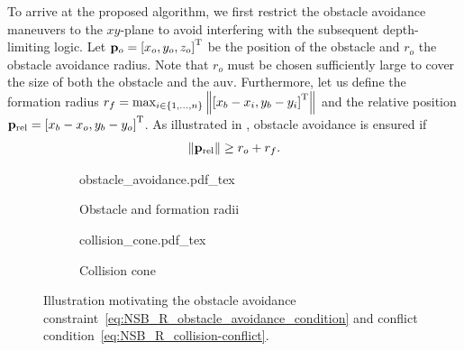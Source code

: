 To arrive at the proposed algorithm, we first restrict the obstacle avoidance maneuvers to the $xy$-plane to avoid interfering with the subsequent depth-limiting logic.
Let $\mathbf{p}_o = \left[x_o, y_o, z_o\right]^{\mathrm{T}}$ be the position of the obstacle and $r_o$ the obstacle avoidance radius.
Note that $r_o$ must be chosen sufficiently large to cover the size of both the obstacle and the \gls{auv}. %
Furthermore, let us define the formation radius
$
    r_f = \max_{i \in \{1, \ldots, n\}} \left\|\left[x_b-x_i, y_b-y_i\right]^{\mathrm{T}}\right\|
$
and the relative position $\mathbf{p}_{\rm rel} = \left[x_b - x_o, y_b - y_o\right]^{\mathrm{T}}$. As illustrated in , obstacle avoidance is ensured if 
\begin{equation}
    \left\|\mathbf{p}_{\rm rel}\right\| \geq r_o + r_f. \label{eq:NSB_R_obstacle_avoidance_condition}
\end{equation}

\begin{figure}[t]
    \centering
    \begin{subfigure}[t]{0.33\textwidth}
        \centering
        \def\svgwidth{\textwidth}
        {obstacle_avoidance.pdf_tex}
        \vspace*{-0.25em}
        \caption{Obstacle and formation radii}
        \label{fig:NSB_R_obstacle_radius}
        \vspace*{-0.25em}
    \end{subfigure}   
    \begin{subfigure}[t]{0.33\textwidth}
        \centering
        \def\svgwidth{\textwidth}
        {collision_cone.pdf_tex}
        \vspace*{-0.25em}
        \caption{Collision cone}
        \label{fig:NSB_R_collision_cone}
        \vspace*{-0.25em}
    \end{subfigure} 
    \caption{Illustration motivating the obstacle avoidance constraint~\eqref{eq:NSB_R_obstacle_avoidance_condition} and conflict condition~\eqref{eq:NSB_R_collision-conflict}.}     
    
\end{figure}



